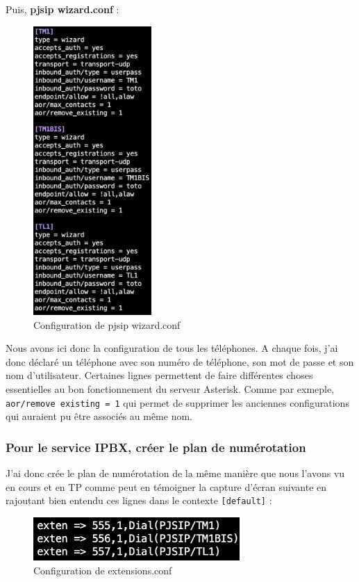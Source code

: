 \documentclass[12pt, a4paper]{article}
\begin{document}
	\newpage
	Puis, \textbf{pjsip wizard.conf} :
	\begin{figure}[h]
		\centering
		\includegraphics[width=0.4\textwidth]{img/wizard.png}
		\caption{Configuration de pjsip wizard.conf}
		\label{fig:wiz}
	\end{figure}

	Nous avons ici donc la configuration de tous les téléphones. A chaque fois, j'ai
	donc déclaré un téléphone avec son numéro de téléphone, son mot de passe et son
	nom d'utilisateur. Certaines lignes permettent de faire différentes choses
	essentielles au bon fonctionnement du serveur Asterisk. Comme par exmeple, 
	\texttt{aor/remove existing = 1} qui permet de
	supprimer les anciennes configurations qui auraient pu être associés au même nom.\\

	\subsubsection{Pour le service IPBX, créer le plan de numérotation}
	J'ai donc crée le plan de numérotation de la même manière que nous l'avons vu en cours
	et en TP comme peut en témoigner la capture d'écran suivante en rajoutant bien 
	entendu ces lignes dans le contexte \texttt{[default]} :
	\begin{figure}[h]
		\centering
		\includegraphics[width=0.7\textwidth]{img/extensions.png}
		\caption{Configuration de extensions.conf}
		\label{fig:ext}
	\end{figure}
\end{document}
